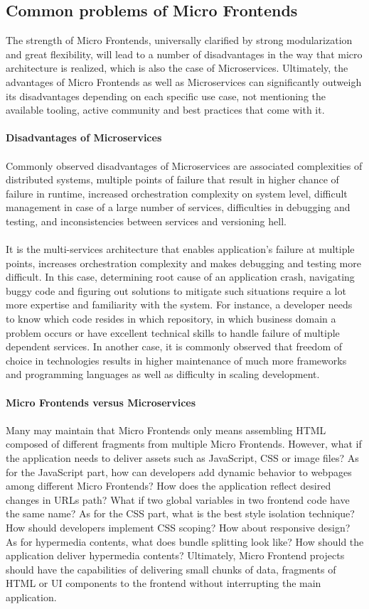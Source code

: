 \documentclass[a4paper]{book}
\begin{document}
\subsection{Common problems of Micro Frontends}
The strength of Micro Frontends, universally clarified by strong modularization and great flexibility, will lead to a number of disadvantages in the way that micro architecture is realized, which is also the case of Microservices. Ultimately, the advantages of Micro Frontends as well as Microservices can significantly outweigh its disadvantages depending on each specific use case, not mentioning the available tooling, active community and best practices that come with it. 
\\ \\
\textbf{Disadvantages of Microservices}
\\ \\
Commonly observed disadvantages of Microservices are associated complexities of distributed systems, multiple points of failure that result in higher chance of failure in runtime, increased orchestration complexity on system level, difficult management in case of a large number of services, difficulties in debugging and testing, and inconsistencies between services and versioning hell.
\\ \\
It is the multi-services architecture that enables application’s failure at multiple points, increases orchestration complexity and makes debugging and testing more difficult. In this case, determining root cause of an application crash, navigating buggy code and figuring out solutions to mitigate such situations require a lot more expertise and familiarity with the system. For instance, a developer needs to know which code resides in which repository, in which business domain a problem occurs or have excellent technical skills to handle failure of multiple dependent services. In another case, it is commonly observed that freedom of choice in technologies results in higher maintenance of much more frameworks and programming languages as well as difficulty in scaling development.
\\ \\
\textbf{Micro Frontends versus Microservices}
\\ \\ 
Many may maintain that Micro Frontends only means assembling HTML composed of different fragments from multiple Micro Frontends. However, what if the application needs to deliver assets such as JavaScript, CSS or image files? As for the JavaScript part, how can developers add dynamic behavior to webpages among different Micro Frontends? How does the application reflect desired changes in URLs path? What if two global variables in two frontend code have the same name? As for the CSS part, what is the best style isolation technique? How should developers implement CSS scoping? How about responsive design? As for hypermedia contents, what does bundle splitting look like? How should the application deliver hypermedia contents? Ultimately, Micro Frontend projects should have the capabilities of delivering small chunks of data, fragments of HTML or UI components to the frontend without interrupting the main application.
\end{document}

